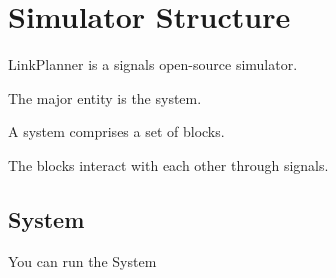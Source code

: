 
\chapter{Simulator Structure}

LinkPlanner is a signals open-source simulator.

The major entity is the system.

A system comprises a set of blocks.

The blocks interact with each other through signals.

\section{System}

You can run the System





